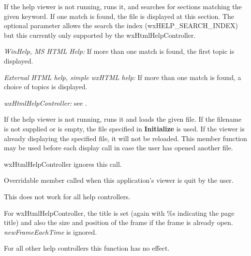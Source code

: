 If the help viewer is not running, runs it, and searches for sections matching
the given keyword. If one match is found, the file is displayed at this
section. The optional parameter allows the search the index
(wxHELP\_SEARCH\_INDEX) but this currently only supported by the
wxHtmlHelpController.

{\it WinHelp, MS HTML Help:} If more than one match is found, 
the first topic is displayed.

{\it External HTML help, simple wxHTML help:} If more than one match is found, 
a choice of topics is displayed.

{\it wxHtmlHelpController:} see .

\label{wxhelpcontrollerloadfile}


If the help viewer is not running, runs it and loads the given file.
If the filename is not supplied or is
empty, the file specified in {\bf Initialize} is used. If the viewer is
already displaying the specified file, it will not be reloaded. This
member function may be used before each display call in case the user
has opened another file.

wxHtmlHelpController ignores this call.

\label{wxhelpcontrolleronquit}


Overridable member called when this application's viewer is quit by the user.

This does not work for all help controllers.

\label{wxhelpcontrollersetframeparameters}


For wxHtmlHelpController, the title is set (again with \%s indicating the
page title) and also the size and position of the frame if the frame is already
open. {\it newFrameEachTime} is ignored.

For all other help controllers this function has no effect.

\label{wxhelpcontrollersetparentwindow}

